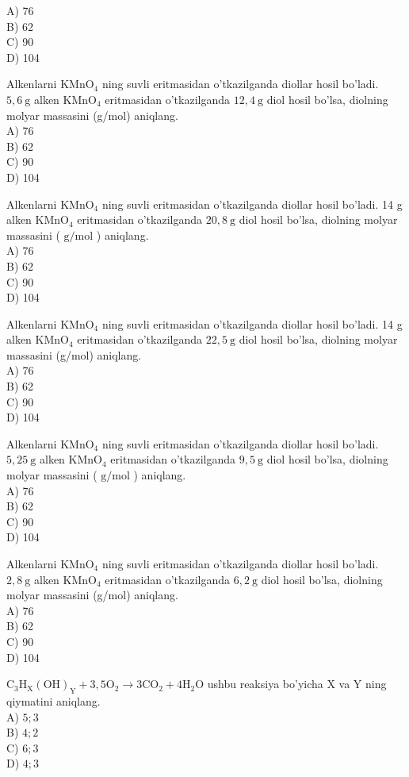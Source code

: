 A) 76\\
B) 62\\
C) 90\\
D) 104
  \item Alkenlarni $\mathrm{KMnO}_{4}$ ning suvli eritmasidan o'tkazilganda diollar hosil bo'ladi. $5,6 \mathrm{~g}$ alken $\mathrm{KMnO}_{4}$ eritmasidan o'tkazilganda $12,4 \mathrm{~g}$ diol hosil bo'lsa, diolning molyar massasini (g/mol) aniqlang.\\
A) 76\\
B) 62\\
C) 90\\
D) 104
  \item Alkenlarni $\mathrm{KMnO}_{4}$ ning suvli eritmasidan o'tkazilganda diollar hosil bo'ladi. 14 g alken $\mathrm{KMnO}_{4}$ eritmasidan o'tkazilganda $20,8 \mathrm{~g}$ diol hosil bo'lsa, diolning molyar massasini ( $\mathrm{g} / \mathrm{mol}$ ) aniqlang.\\
A) 76\\
B) 62\\
C) 90\\
D) 104
  \item Alkenlarni $\mathrm{KMnO}_{4}$ ning suvli eritmasidan o'tkazilganda diollar hosil bo'ladi. 14 g alken $\mathrm{KMnO}_{4}$ eritmasidan o'tkazilganda $22,5 \mathrm{~g}$ diol hosil bo'lsa, diolning molyar massasini (g/mol) aniqlang.\\
A) 76\\
B) 62\\
C) 90\\
D) 104
  \item Alkenlarni $\mathrm{KMnO}_{4}$ ning suvli eritmasidan o'tkazilganda diollar hosil bo'ladi. $5,25 \mathrm{~g}$ alken $\mathrm{KMnO}_{4}$ eritmasidan o'tkazilganda $9,5 \mathrm{~g}$ diol hosil bo'lsa, diolning molyar massasini ( $\mathrm{g} / \mathrm{mol}$ ) aniqlang.\\
A) 76\\
B) 62\\
C) 90\\
D) 104
  \item Alkenlarni $\mathrm{KMnO}_{4}$ ning suvli eritmasidan o'tkazilganda diollar hosil bo'ladi. $2,8 \mathrm{~g}$ alken $\mathrm{KMnO}_{4}$ eritmasidan o'tkazilganda $6,2 \mathrm{~g}$ diol hosil bo'lsa, diolning molyar massasini (g/mol) aniqlang.\\
A) 76\\
B) 62\\
C) 90\\
D) 104
  \item $\mathrm{C}_{3} \mathrm{H}_{\mathrm{X}}(\mathrm{OH})_{\mathrm{Y}}+3,5 \mathrm{O}_{2} \rightarrow 3 \mathrm{CO}_{2}+4 \mathrm{H}_{2} \mathrm{O}$ ushbu reaksiya bo'yicha X va Y ning qiymatini aniqlang.\\
A) $5 ; 3$\\
B) $4 ; 2$\\
C) $6 ; 3$\\
D) $4 ; 3$ 

